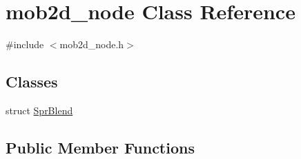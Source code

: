 \hypertarget{classmob2d__node}{
\section{mob2d\_\-node Class Reference}
\label{classmob2d__node}
}


{\ttfamily \#include $<$mob2d\_\-node.h$>$}\subsection*{Classes}
\begin{DoxyCompactItemize}
\item 
struct \hyperlink{structmob2d__node_1_1SprBlend}{SprBlend}
\end{DoxyCompactItemize}
\subsection*{Public Member Functions}
